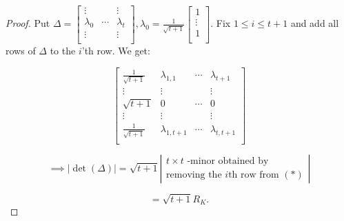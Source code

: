 \documentclass[openany]{amsbook}
\numberwithin{section}{chapter}
\theoremstyle{definition}
\begin{document}
\begin{proof}
    Put \(\Delta = \begin{bmatrix}
        \vdots &  &  \vdots \\
        \lambda_0 & \cdots &  \lambda_t \\
        \vdots &  &  \vdots \\
    \end{bmatrix}, \lambda_0 = \frac{1}{\sqrt{t+1}} \begin{bmatrix}
         1 \\
         \vdots \\
         1 \\
    \end{bmatrix}\). Fix \(1 \leq i \leq t+1\) and add all rows of \(\Delta\) to the \(i\)'th row. We get:
    
    \[
        \begin{bmatrix}
            \frac{1}{\sqrt{t+1}} & \lambda_{1,1} & \cdots &  \lambda_{t+1} \\
            \vdots & \vdots &  &  \vdots \\
            \sqrt{t+1} & 0 & \cdots & 0 \\
            \vdots & \vdots &  & \vdots \\
            \frac{1}{\sqrt{t+1}} & \lambda_{1,t+1} & \cdots & \lambda_{t,t+1} \\
        \end{bmatrix}
    \]

    \[
        \implies \vert \det (\Delta) \vert = \sqrt{t+1} \left\vert \begin{matrix}\text{\(t \times t\) -minor obtained by}\\ \text{removing the \(i\)th row from \((\ast)\)}\end{matrix} \right\vert  
    \]

    \[
        = \sqrt{t+1} R_K.
    \]

\end{proof}
\end{document}
